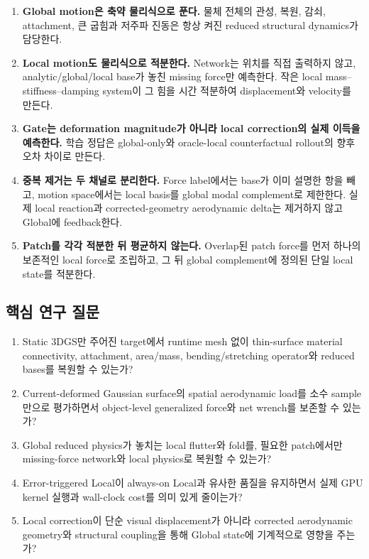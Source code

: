 \documentclass[11pt,a4paper]{article}
\begin{document}
\begin{enumerate}[leftmargin=1.7em]
  \item \textbf{Global motion은 축약 물리식으로 푼다.}
  물체 전체의 관성, 복원, 감쇠, attachment, 큰 굽힘과 저주파 진동은 항상 켜진 reduced structural dynamics가 담당한다.
  \item \textbf{Local motion도 물리식으로 적분한다.}
  Network는 위치를 직접 출력하지 않고, analytic/global/local base가 놓친 missing force만 예측한다.
  작은 local mass--stiffness--damping system이 그 힘을 시간 적분하여 displacement와 velocity를 만든다.
  \item \textbf{Gate는 deformation magnitude가 아니라 local correction의 실제 이득을 예측한다.}
  학습 정답은 global-only와 oracle-local counterfactual rollout의 향후 오차 차이로 만든다.
  \item \textbf{중복 제거는 두 채널로 분리한다.}
  Force label에서는 base가 이미 설명한 항을 빼고,
  motion space에서는 local basis를 global modal complement로 제한한다.
  실제 local reaction과 corrected-geometry aerodynamic delta는 제거하지 않고 Global에 feedback한다.
  \item \textbf{Patch를 각각 적분한 뒤 평균하지 않는다.}
  Overlap된 patch force를 먼저 하나의 보존적인 local force로 조립하고,
  그 뒤 global complement에 정의된 단일 local state를 적분한다.
\end{enumerate}

\subsection{핵심 연구 질문}

\begin{enumerate}[leftmargin=1.7em]
  \item Static 3DGS만 주어진 target에서 runtime mesh 없이 thin-surface material connectivity,
  attachment, area/mass, bending/stretching operator와 reduced bases를 복원할 수 있는가?
  \item Current-deformed Gaussian surface의 spatial aerodynamic load를 소수 sample만으로 평가하면서
  object-level generalized force와 net wrench를 보존할 수 있는가?
  \item Global reduced physics가 놓치는 local flutter와 fold를,
  필요한 patch에서만 missing-force network와 local physics로 복원할 수 있는가?
  \item Error-triggered Local이 always-on Local과 유사한 품질을 유지하면서
  실제 GPU kernel 실행과 wall-clock cost를 의미 있게 줄이는가?
  \item Local correction이 단순 visual displacement가 아니라
  corrected aerodynamic geometry와 structural coupling을 통해 Global state에 기계적으로 영향을 주는가?
\end{enumerate}
\end{document}
